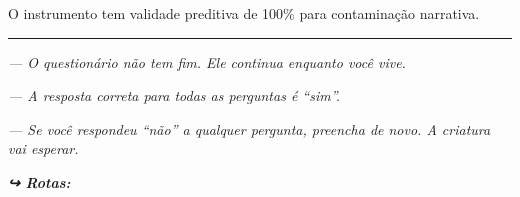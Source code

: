 \noindent O instrumento tem validade preditiva de 100\% para contaminação narrativa.

\vspace{0.5em}\noindent\rule{\textwidth}{0.5pt}\vspace{0.5em}

\noindent \textit{--- O questionário não tem fim. Ele continua enquanto você vive.}

\noindent \textit{--- A resposta correta para todas as perguntas é \textquotedblleft{}sim\textquotedblright{}.}

\noindent \textit{--- Se você respondeu \textquotedblleft{}não\textquotedblright{} a qualquer pergunta, preencha de novo. A criatura vai esperar.}

\vspace{0.5em}
\noindent\textit{\textbf{↪ Rotas:}  \rotasep {}}
